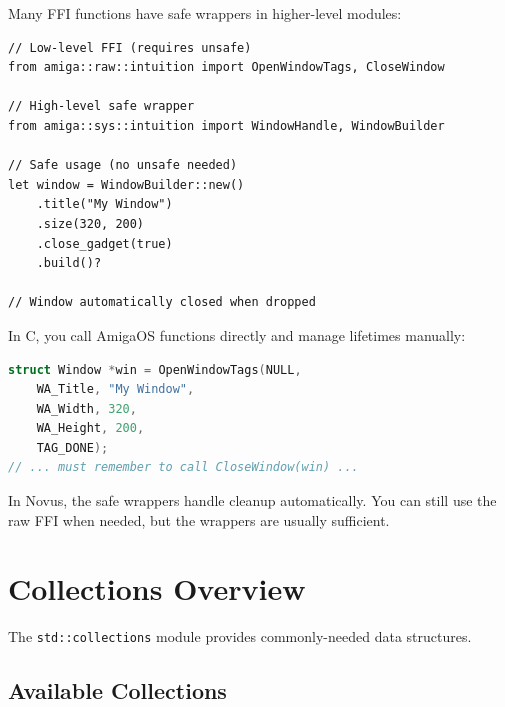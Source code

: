 Many FFI functions have safe wrappers in higher-level modules:

\begin{lstlisting}
// Low-level FFI (requires unsafe)
from amiga::raw::intuition import OpenWindowTags, CloseWindow

// High-level safe wrapper
from amiga::sys::intuition import WindowHandle, WindowBuilder

// Safe usage (no unsafe needed)
let window = WindowBuilder::new()
    .title("My Window")
    .size(320, 200)
    .close_gadget(true)
    .build()?

// Window automatically closed when dropped
\end{lstlisting}

\begin{comingfromc}
In C, you call AmigaOS functions directly and manage lifetimes manually:

\begin{lstlisting}[language=C]
struct Window *win = OpenWindowTags(NULL,
    WA_Title, "My Window",
    WA_Width, 320,
    WA_Height, 200,
    TAG_DONE);
// ... must remember to call CloseWindow(win) ...
\end{lstlisting}

In Novus, the safe wrappers handle cleanup automatically. You can still use the raw FFI when needed, but the wrappers are usually sufficient.
\end{comingfromc}

\section{Collections Overview}
\label{sec:stdlib-collections}

The \texttt{std::collections} module provides commonly-needed data structures.

\subsection{Available Collections}

